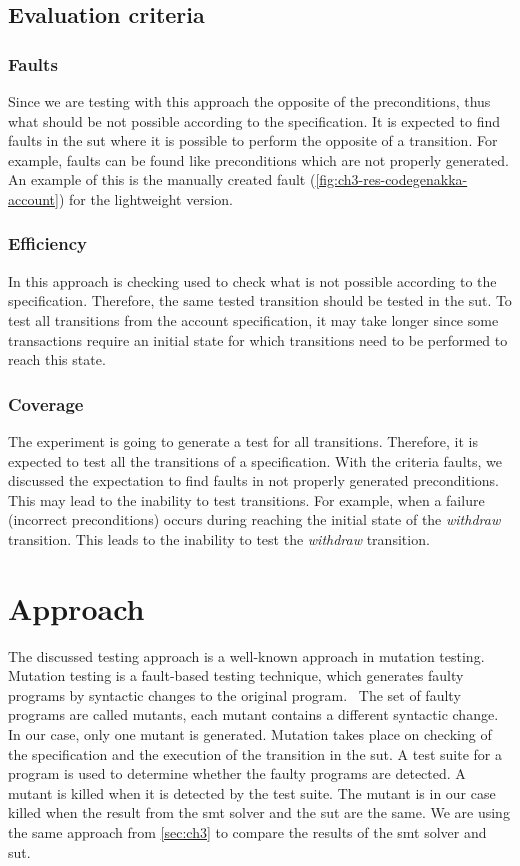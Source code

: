 \subsection{Evaluation criteria}\label{sec:ch4-eval-criteria}

\subsubsection{Faults}
Since we are testing with this approach the opposite of the preconditions, thus
what should be not possible according to the specification. It is expected to
find faults in the \gls{sut} where it is possible to perform the opposite of a
transition. For example, faults can be found like preconditions which are not
properly generated. An example of this is the manually created fault
(\autoref{fig:ch3-res-codegenakka-account}) for the lightweight version.

\subsubsection{Efficiency}
In this approach is checking used to check what is not possible according to the
specification. Therefore, the same tested transition should be tested in the
\gls{sut}. To test all transitions from the account specification, it may take
longer since some transactions require an initial state for which transitions
need to be performed to reach this state.

\subsubsection{Coverage}
The experiment is going to generate a test for all transitions. Therefore,
it is expected to test all the transitions of a specification. With the criteria
faults, we discussed the expectation to find faults in not properly generated
preconditions. This may lead to the inability to test transitions. For example,
when a failure (incorrect preconditions) occurs during reaching the initial
state of the \textit{withdraw} transition. This leads to the inability to test
the \textit{withdraw} transition.

\section{Approach}
The discussed testing approach is a well-known approach in mutation testing. Mutation testing is
a fault-based testing technique, which generates faulty programs by syntactic
changes to the original program.~\cite[p.~1]{jia2011analysis} The set of faulty
programs are called mutants, each mutant contains a different syntactic change.
In our case, only one mutant is generated. Mutation takes place on checking of
the specification and the execution of the transition in the \gls{sut}. A test
suite for a program is used to determine whether the faulty programs are detected.
A mutant is killed when it is detected by the test suite. The mutant is in our
case killed when the result from the \gls{smt} solver and the \gls{sut} are the
same. We are using the same approach from \autoref{sec:ch3} to compare the
results of the \gls{smt} solver and \gls{sut}.

